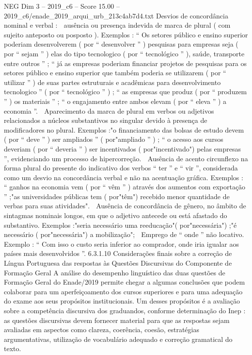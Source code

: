 \begin{textsample}{NEG Dim 3 – 2019\_c6 – Score 15.00 – 2019\_c6/enade\_2019\_arqui\_urb\_213c4ab7d4.txt}
Desvios de concordância nominal e verbal :  ausência ou presença indevida de marca de plural ( com sujeito anteposto ou posposto ).
Exemplos : “ Os setores público e ensino superior poderiam desenvolverem ( por “ desenvolver ” ) pesquisas para empresas seja ( por “ sejam ” ) elas do tipo tecnologico ( por “ tecnológico ” ), saúde, transporte entre outros ” ; “ já as empresas poderiam financiar projetos de pesquisas para os setores público e ensino superior que também poderia se utilizarem ( por “ utilizar ” ) de suas partes estruturais e acadêmicas para desenvolvimento tecnologico ” ( por “ tecnológico ” ) ; “ as empresas que produz ( por “ produzem ” ) os materiais ” ; “ o engajamento entre ambos elevam ( por “ eleva ” ) a economia ”.  Aparecimento da marca de plural em verbos ou adjetivos relacionados a núcleos substantivos no singular devido à presença de modificadores no plural.
Exemplos :"o financiamento das bolsas de estudo devem ( por “ deve ” ) ser ampliados ” ( por"ampliado ” ) ; “ o acesso aos cursos deveriam ( por “ deveria ” ) ser incentivados ( por"incentivado") pelas empresas ”, evidenciando um processo de hipercorreção.  Ausência de acento circunflexo na forma plural do presente do indicativo dos verbos “ ter ” e “ vir ”, considerada como um desvio na concordância verbal e não na acentuação gráfica.
Exemplos : “ ganhos na economia vem ( por “ vêm ” ) através dos aumentos com exportação ” ;"as universidades públicas tem ( por"têm") recebido menor quantidade de verbas para suas atividades".  Ausência de concordância de gênero, no âmbito de sintagmas nominais longos, em que o adjetivo antecede ou está afastado do substantivo.
Exemplos :"seria necessário uma reeducação"( por"necessária") ;"é necessário ( por"necessária") a mobilização";  Emprego de “ onde ” não locativo.
Exemplo : “ Com isso o custo seria inferior ao comprador, onde iria igualar aos países mais desenvolvidos ”. 6.3.1.10 Considerações finais sobre a correção de Língua Portuguesa das respostas às Questões Discursivas do Componente de Formação Geral A análise do desempenho linguístico das duas questões de Formação Geral do Enade/2019 permite chegar a algumas conclusões que podem colaborar para um aperfeiçoamento dos cursos superiores e para uma adequação do exame aos seus propósitos institucionais.
Um desses propósitos é a avaliação sobre a competência discursiva dos graduandos, conforme determinação do Inep : as questões discursivas devem fornecer material para que as respostas sejam avaliadas em aspectos como clareza, coerência, coesão, estratégias argumentativas, utilização de vocabulário adequado e correção gramatical do texto.

\end{textsample}
